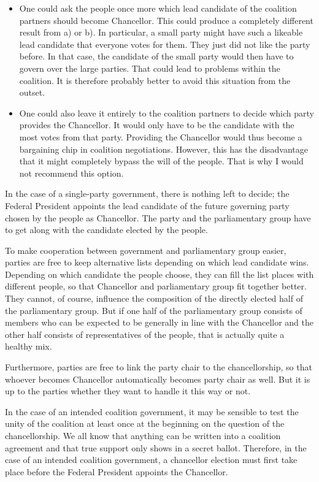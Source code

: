 \begin{itemize}
  \item One could ask the people once more which lead candidate of the coalition partners should become Chancellor. This
    could produce a completely different result from a) or b). In particular, a small party might
    have such a likeable lead candidate that everyone votes for them. They just did not like the party before. In that
    case, the candidate of the small party would then have to govern over the large parties. That could lead to problems within
    the coalition. It is therefore probably better to avoid this situation from the outset.
  \item One could also leave it entirely to the coalition partners to decide which party provides the Chancellor. It would
    only have to be the candidate with the most votes from that party. Providing the Chancellor would thus become
    a bargaining chip in coalition negotiations.
    However, this has the disadvantage that it might completely bypass the will of the people.
    That is why I would not recommend this option.
\end{itemize}

In the case of a single-party government, there is nothing left to decide; the Federal President appoints the lead candidate
of the future governing party chosen by the people as Chancellor. The party and the parliamentary group have to get along
with the candidate elected by the people.

To make cooperation between government and parliamentary group easier,
parties are free to keep alternative lists depending on which lead candidate wins.
Depending on which candidate the people choose, they can fill the list places with different people, so that Chancellor
and parliamentary group fit together better.
They cannot, of course, influence the composition of the directly elected half of the parliamentary group.
But if one half of the parliamentary group consists of members who can be expected to be generally in line with
the Chancellor and the other half consists of representatives of the people, that is actually quite a
healthy mix.

Furthermore, parties are free to link the party chair to the chancellorship, so that whoever becomes Chancellor
automatically becomes party chair as well.
But it is up to the parties whether they want to handle it this way or not.

In the case of an intended coalition government, it may be sensible to test the unity of the coalition at least once at the beginning
on the question of the chancellorship.
We all know that anything can be written into a coalition agreement and that true support only shows in a secret ballot.
Therefore, in the case of an intended coalition government, a chancellor election must first take place before the Federal President
appoints the Chancellor.

